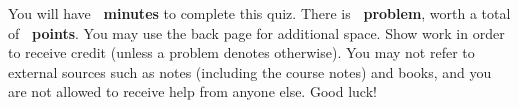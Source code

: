 \begin{tcolorbox}[enhanced,attach boxed title to top center=
	{yshift=-2mm,yshifttext=-1mm},colback=white,colframe=black,colbacktitle=black,title={\textbf{Instructions}}]
	You will have \textbf{\ minutes} to complete this quiz. There is \textbf{\ problem}, worth a total of \textbf{\ points}. You may use the back page for additional space. Show work in order to receive credit (unless a problem denotes otherwise). You may not refer to external sources such as notes (including the course notes) and books, and you are not allowed to receive help from anyone else. Good luck!
\end{tcolorbox}